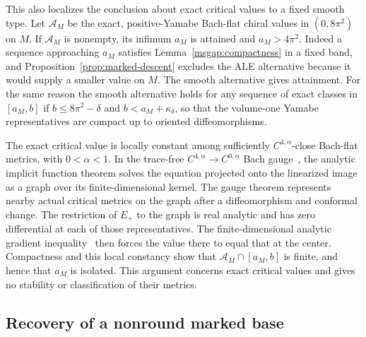 \documentclass[11pt]{article}
\numberwithin{equation}{section}
\theoremstyle{definition}
\theoremstyle{remark}
\begin{document}
This also localizes the conclusion about exact critical values to a
fixed smooth type. Let \(\mathcal A_M\) be the exact,
positive-Yamabe Bach-flat chiral values in \((0,8\pi^2)\) on \(M\).
If \(\mathcal A_M\) is nonempty, its infimum \(a_M\) is attained and
\(a_M>4\pi^2\). Indeed a sequence approaching \(a_M\) satisfies
Lemma~\ref{msgap:compactness} in a fixed band, and
Proposition~\ref{prop:marked-descent} excludes the ALE alternative
because it would supply a smaller value on \(M\). The smooth
alternative gives attainment. For the same reason the smooth
alternative holds for any sequence of exact classes in
\([a_M,b]\) if \(b\le8\pi^2-\delta\) and \(b<a_M+\kappa_\delta\),
so that the volume-one Yamabe representatives are compact up to
oriented diffeomorphisms.

The exact critical value is locally constant among sufficiently
\(C^{4,\alpha}\)-close Bach-flat metrics, with \(0<\alpha<1\).
In the trace-free \(C^{4,\alpha}\to C^{0,\alpha}\) Bach
gauge~\cite[(2.59) and Theorem 2.11]{GurskyViaclovsky2015}, the
analytic implicit function theorem solves the equation projected
onto the linearized image as a graph over its finite-dimensional
kernel. The gauge theorem represents nearby actual critical metrics
on the graph after a diffeomorphism and conformal change. The
restriction of \(E_+\) to the graph is real
analytic and has zero differential at each of those representatives.
The finite-dimensional analytic gradient
inequality~\cite[Theorem 1]{Feehan2020Gradient} then forces the value
there to equal that at the center. Compactness and this local
constancy show that \(\mathcal A_M\cap[a_M,b]\) is finite, and hence
that \(a_M\) is isolated. This argument concerns exact critical
values and gives no stability or classification of their metrics.

\subsection{Recovery of a nonround marked base}
\end{document}
